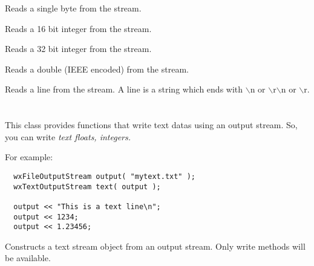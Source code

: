 Reads a single byte from the stream.



Reads a 16 bit integer from the stream.



Reads a 32 bit integer from the stream.



Reads a double (IEEE encoded) from the stream.



Reads a line from the stream. A line is a string which ends with
$\backslash$n or $\backslash$r$\backslash$n or $\backslash$r.


\section{}\label{wxtextoutputstream}

This class provides functions that write text datas using an output stream.
So, you can write \it{text} floats, integers.

For example:
\begin{verbatim}
  wxFileOutputStream output( "mytext.txt" );
  wxTextOutputStream text( output );

  output << "This is a text line\n";
  output << 1234;
  output << 1.23456;
\end{verbatim}


\label{wxdataoutputstreamconstr}


Constructs a text stream object from an output stream. Only write methods will
be available.

